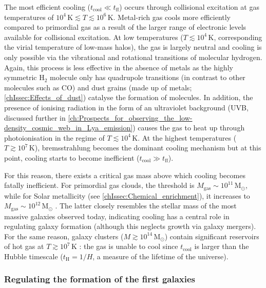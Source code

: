 The most efficient cooling ($t_\text{cool} \ll t_\text{ff}$) occurs through collisional excitation at gas temperatures of $10^4 \, \mathrm{K} \lesssim T \lesssim 10^6 \, \mathrm{K}$. Metal-rich gas cools more efficiently compared to primordial gas as a result of the larger range of electronic levels available for collisional excitation. At low temperatures ($T \lesssim 10^4 \, \mathrm{K}$, corresponding the virial temperature of low-mass halos), the gas is largely neutral and cooling is only possible via the vibrational and rotational transitions of molecular hydrogen. Again, this process is less effective in the absence of metals as the highly symmetric $\mathrm{H_2}$ molecule only has quadrupole transitions (in contrast to other molecules such as $\mathrm{CO}$) and dust grains (made up of metals; \cref{chIssec:Effects_of_dust}) catalyse the formation of molecules. In addition, the presence of ionising radiation in the form of an ultraviolet background (UVB, discussed further in \cref{ch:Prospects_for_observing_the_low-density_cosmic_web_in_Lya_emission}) causes the gas to heat up through photoionisation in the regime of $T \lesssim 10^4 \, \mathrm{K}$. At the highest temperatures ($T \gtrsim 10^7 \, \mathrm{K}$), bremsstrahlung becomes the dominant cooling mechanism but at this point, cooling starts to become inefficient ($t_\text{cool} \gg t_\text{ff}$).

For this reason, there exists a critical gas mass above which cooling becomes fatally inefficient. For primordial gas clouds, the threshold is $M_\text{gas} \sim 10^{11} \, \mathrm{M_\odot}$, while for Solar metallicity (see \cref{chIssec:Chemical_enrichment}), it increases to $M_\text{gas} \sim 10^{12} \, \mathrm{M_\odot}$ \citep[e.g.][]{1977MNRAS.179..541R, 1978MNRAS.183..341W}. The latter closely resembles the stellar mass of the most massive galaxies observed today, indicating cooling has a central role in regulating galaxy formation (although this neglects growth via galaxy mergers). For the same reason, galaxy clusters ($M \gtrsim 10^{14} \, \mathrm{M_\odot}$) contain significant reservoirs of hot gas at $T \gtrsim 10^{7} \, \mathrm{K}$ \citep[which can be observed in X-ray emission; e.g.][]{2001ApJ...546...63T}: the gas is unable to cool since $t_\text{cool}$ is larger than the Hubble timescale ($t_\text{H} = 1/H$, a measure of the lifetime of the universe).

\subsubsection{Regulating the formation of the first galaxies}
\label{chIsssec:Regulating_the_formation_of_the_first_galaxies}

